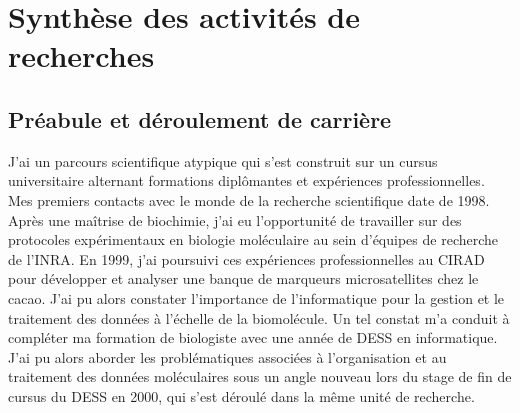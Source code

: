 \chapter{Synthèse des activités de recherches} %

\label{synthese} %

\section{Préabule et déroulement de carrière}
J’ai un parcours scientifique atypique qui s’est construit sur un cursus universitaire alternant formations diplômantes et expériences professionnelles. Mes premiers contacts avec le monde de la recherche scientifique date de 1998. Après une maîtrise de biochimie, j’ai eu l’opportunité de travailler sur des protocoles expérimentaux en biologie moléculaire au sein d’équipes de recherche de l’INRA. En 1999, j’ai poursuivi ces expériences professionnelles au CIRAD pour développer et analyser une banque de marqueurs microsatellites chez le cacao. J’ai pu alors constater l’importance de l’informatique pour la gestion et le traitement des données à l’échelle de la biomolécule. Un tel constat m’a conduit à compléter ma formation de biologiste avec une année de DESS en informatique. J’ai pu alors aborder les problématiques associées à l’organisation et au traitement des données moléculaires sous un angle nouveau lors du stage de fin de cursus du DESS en 2000, qui s’est déroulé dans la même unité de recherche. \\

